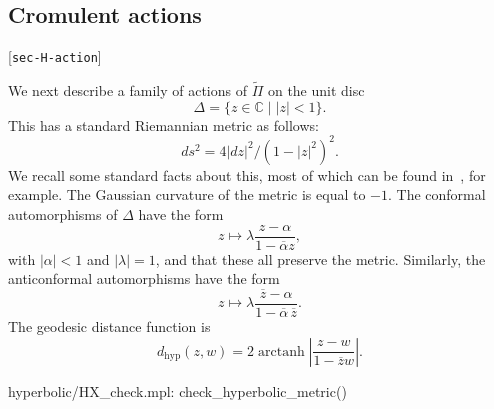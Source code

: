 \documentclass[reqno]{amsart}
\newcommand{\lbl}[1]{\label{#1}\textup{[\texttt{#1}]}\par}
\newcommand{\lbl}{\label}
\newcommand{\arctanh}	{\operatorname{arctanh}}
\newcommand{\Dl}        {\Delta}
\newcommand{\al}        {\alpha}
\newcommand{\lm}        {\lambda}
\newcommand{\C}         {{\mathbb{C}}}
\newcommand{\ov}[1]     {\overline{#1}}
\newcommand{\st}        {\;|\;}
\newcommand{\dhyp}      {d_{\text{hyp}}}
\newcommand{\tPi}	{\widetilde{\Pi}}
\renewcommand{\:}{\colon}
\theoremstyle{definition}
\begin{document}
\subsection{Cromulent actions}
\lbl{sec-H-action}

We next describe a family of actions of $\tPi$ on the unit disc
\[ \Dl = \{z\in\C\st |z|<1\}. \]
This has a standard Riemannian metric as follows:
\[ ds^2 = 4|dz|^2 / (1-|z|^2)^2. \]
We recall some standard facts about this, most of which can be found
in~\cite[Section 4.1]{an:hg}, for example.  The Gaussian curvature of
the metric is equal to $-1$.  The conformal automorphisms of $\Dl$
have the form
\[ z \mapsto \lm \frac{z-\al}{1-\ov{\al}z}, \]
with $|\al|<1$ and $|\lm|=1$, and that these all preserve the
metric.  Similarly, the anticonformal automorphisms have the form
\[ z \mapsto \lm \frac{\ov{z}-\al}{1-\ov{\al}\,\ov{z}}. \]
The geodesic distance function is
\[ \dhyp(z,w) =
     2\arctanh\left|\frac{z-w}{1-\ov{z}w}\right|.
\]
\begin{checks}
 hyperbolic/HX_check.mpl: check_hyperbolic_metric()
\end{checks}
\end{document}
